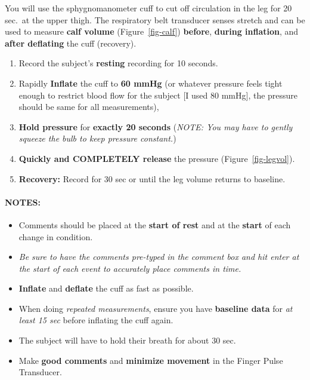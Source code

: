 \documentclass[
  letterpaper,
  DIV=11,
  numbers=noendperiod,
  oneside]{scrartcl}
\let\oldparagraph\paragraph
\renewcommand{\paragraph}[1]{\oldparagraph{#1}\mbox{}}
\providecommand{\tightlist}{%
  \setlength{\itemsep}{0pt}\setlength{\parskip}{0pt}}\usepackage{longtable,booktabs,array}
\begin{document}
\begin{tcolorbox}[enhanced jigsaw, opacityback=0, colbacktitle=quarto-callout-tip-color!10!white, opacitybacktitle=0.6, colback=white, leftrule=.75mm, title=\textcolor{quarto-callout-tip-color}{\faLightbulb}\hspace{0.5em}{Protocol: Basic Leg volume measurement}, breakable, rightrule=.15mm, colframe=quarto-callout-tip-color-frame, bottomrule=.15mm, bottomtitle=1mm, arc=.35mm, toptitle=1mm, titlerule=0mm, toprule=.15mm, left=2mm, coltitle=black]

You will use the sphygnomanometer cuff to cut off circulation in the leg
for 20 sec.~at the upper thigh. The respiratory belt transducer senses
stretch and can be used to measure \textbf{calf volume}
(Figure~\ref{fig-calf}) \textbf{before}, \textbf{during inflation}, and
\textbf{after deflating} the cuff (recovery).

\begin{enumerate}
\def\labelenumi{\arabic{enumi}.}
\tightlist
\item
  Record the subject's \textbf{resting} recording for 10 seconds.
\item
  Rapidly \textbf{Inflate} the cuff to \textbf{60 mmHg} (or whatever
  pressure feels tight enough to restrict blood flow for the subject
  {[}I used 80 mmHg{]}, the pressure should be same for all
  measurements),
\item
  \textbf{Hold pressure} for \textbf{exactly 20 seconds} (\emph{NOTE:
  You may have to gently squeeze the bulb to keep pressure constant.})
\item
  \textbf{Quickly and COMPLETELY release} the pressure
  (Figure~\ref{fig-legvol}).
\item
  \textbf{Recovery:} Record for 30 sec or until the leg volume returns
  to baseline.
\end{enumerate}

\hypertarget{notes-1}{%
\paragraph{NOTES:}\label{notes-1}}

\begin{itemize}
\tightlist
\item
  {Comments should be placed at the \textbf{start of rest} and at the
  \textbf{start} of each change in condition.}
\item
  \emph{Be sure to have the comments pre-typed in the comment box and
  hit enter at the start of each event to accurately place comments in
  time.}
\item
  \textbf{Inflate} and \textbf{deflate} the cuff as fast as possible.
\item
  When doing \emph{repeated measurements}, ensure you have
  \textbf{baseline data} for \emph{at least 15 sec} before inflating the
  cuff again.
\item
  The subject will have to hold their breath for about 30 sec.~
\item
  Make \textbf{good comments} and \textbf{minimize movement} in the
  Finger Pulse Transducer.
\end{itemize}

\end{tcolorbox}
\end{document}
